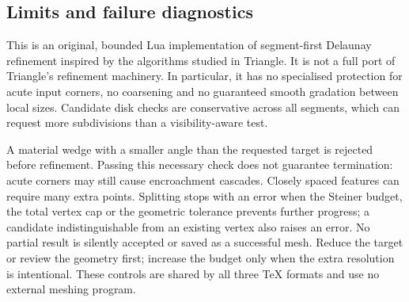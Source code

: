 \subsection{Limits and failure diagnostics}
This is an original, bounded Lua implementation of segment-first Delaunay
refinement inspired by the algorithms studied in Triangle. It is not a full
port of Triangle's refinement machinery. In particular, it has no specialised
protection for acute input corners, no coarsening and no guaranteed smooth
gradation between local sizes. Candidate disk checks are conservative across
all segments, which can request more subdivisions than a visibility-aware test.

A material wedge with a smaller angle than the requested target is rejected
before refinement. Passing this necessary check does not guarantee termination:
acute corners may still cause encroachment cascades. Closely spaced features
can require many extra points. Splitting stops with an error when the Steiner
budget, the total vertex cap or the geometric tolerance prevents further
progress; a candidate indistinguishable from an existing vertex also raises
an error. No partial result is silently accepted or saved as a successful mesh.
Reduce the target or review the geometry first; increase the budget only when
the extra resolution is intentional. These controls are shared by all three
TeX formats and use no external meshing program.
